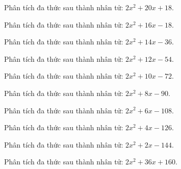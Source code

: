 \begin{bt}
	Phân tích đa thức sau thành nhân tử: $2 x^2 + 20 x + 18$.
\end{bt}
\begin{bt}
	Phân tích đa thức sau thành nhân tử: $2 x^2 + 16 x - 18$.
\end{bt}
\begin{bt}
	Phân tích đa thức sau thành nhân tử: $2 x^2 + 14 x - 36$.
\end{bt}
\begin{bt}
	Phân tích đa thức sau thành nhân tử: $2 x^2 + 12 x - 54$.
\end{bt}
\begin{bt}
	Phân tích đa thức sau thành nhân tử: $2 x^2 + 10 x - 72$.
\end{bt}
\begin{bt}
	Phân tích đa thức sau thành nhân tử: $2 x^2 + 8 x - 90$.
\end{bt}
\begin{bt}
	Phân tích đa thức sau thành nhân tử: $2 x^2 + 6 x - 108$.
\end{bt}
\begin{bt}
	Phân tích đa thức sau thành nhân tử: $2 x^2 + 4 x - 126$.
\end{bt}
\begin{bt}
	Phân tích đa thức sau thành nhân tử: $2 x^2 + 2 x - 144$.
\end{bt}
\begin{bt}
	Phân tích đa thức sau thành nhân tử: $2 x^2 + 36 x + 160$.
\end{bt}
